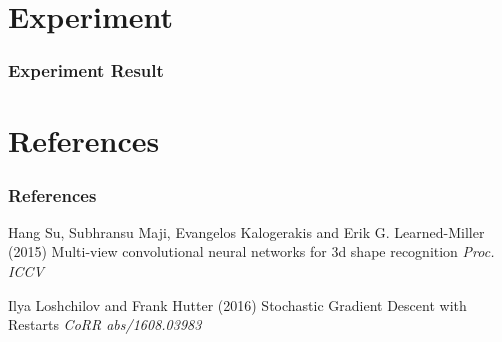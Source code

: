 \documentclass{beamer}
\begin{document}
\section{Experiment} %

\begin{frame}
\frametitle{Experiment Result}

	

\end{frame}

\section{References} %

\begin{frame}
	\frametitle{References}
	\footnotesize{
		\begin{thebibliography}{99} %
			 Hang Su, Subhransu Maji, Evangelos Kalogerakis and Erik G. Learned{-}Miller (2015)
			\newblock Multi-view convolutional neural networks for 3d shape recognition
			\newblock \emph{Proc. ICCV}
		\end{thebibliography}

		\begin{thebibliography}{99} %
			 Ilya Loshchilov and Frank Hutter (2016)
			 Stochastic Gradient Descent with Restarts
			\newblock \emph{CoRR abs/1608.03983}
		\end{thebibliography}
	}
\end{frame}
\end{document}
